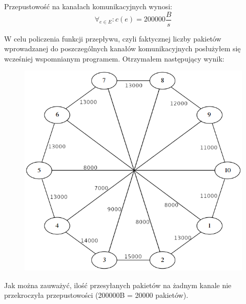 \documentclass[titlepage]{article}
\begin{document}
Przepustowość na kanałach komunikacyjnych wynosi:
\begin{equation*}
	\forall_{e\in E}: c(e) = 200000\frac{B}{s}
\end{equation*}

W celu policzenia funkcji przepływu, czyli faktycznej liczby pakietów wprowadzanej do poszczególnych kanałów komunikacyjnych posłużyłem się wcześniej wspomnianym programem. Otrzymałem następujący wynik:

\begin{figure}[h!]
	\centering
	\includegraphics[width=0.8\linewidth]{graph6.png}
\end{figure}

Jak można zauważyć, ilość przesyłanych pakietów na żadnym kanale nie przekroczyła przepustowości (200000B = 20000 pakietów).
\end{document}
